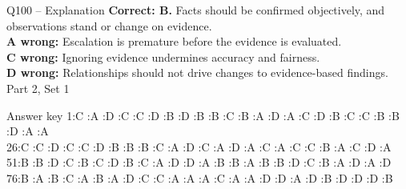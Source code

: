 \documentclass[aspectratio=169,10pt]{beamer}
\begin{document}
\begin{frame}[t]{Q100 -- Explanation}
	\footnotesize
	\textbf{Correct: B.} Facts should be confirmed objectively, and observations stand or change on evidence. \\[5pt]
\textbf{A wrong:} Escalation is premature before the evidence is evaluated. \\[3pt]
\textbf{C wrong:} Ignoring evidence undermines accuracy and fairness. \\[3pt]
\textbf{D wrong:} Relationships should not drive changes to evidence-based findings. \\[3pt]
	\vfill {\tiny Part 2, Set 1}
\end{frame}
\begin{frame}{Answer key}
\small
1:C :A :D :C :C :D :B :D :B :B :C :B :A :D :A :C :D :B :C :C :B :B :D :A :A \\[6pt]
26:C :C :D :C :C :D :B :B :B :C :A :D :C :A :D :A :C :A :C :C :B :A :C :D :A \\[6pt]
51:B :B :D :C :B :C :D :B :C :A :D :D :A :B :B :A :B :B :D :C :B :A :D :A :D \\[6pt]
76:B :A :B :C :A :B :A :D :C :C :A :A :A :C :A :A :D :D :A :D :B :D :D :D :B
\end{frame}
\end{document}
